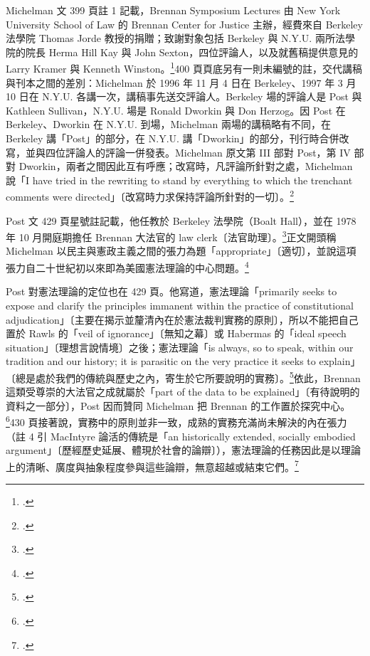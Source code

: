 Michelman 文 399 頁註 1 記載，Brennan Symposium Lectures 由 New York University School of Law 的 Brennan Center for Justice 主辦，經費來自 Berkeley 法學院 Thomas Jorde 教授的捐贈；致謝對象包括 Berkeley 與 N.Y.U. 兩所法學院的院長 Herma Hill Kay 與 John Sexton，四位評論人，以及就舊稿提供意見的 Larry Kramer 與 Kenneth Winston。\footcite[399 n.1]{michelman1998}400 頁頁底另有一則未編號的註，交代講稿與刊本之間的差別：Michelman 於 1996 年 11 月 4 日在 Berkeley、1997 年 3 月 10 日在 N.Y.U. 各講一次，講稿事先送交評論人。Berkeley 場的評論人是 Post 與 Kathleen Sullivan，N.Y.U. 場是 Ronald Dworkin 與 Don Herzog。因 Post 在 Berkeley、Dworkin 在 N.Y.U. 到場，Michelman 兩場的講稿略有不同，在 Berkeley 講「Post」的部分，在 N.Y.U. 講「Dworkin」的部分，刊行時合併改寫，並與四位評論人的評論一併發表。Michelman 原文第 III 部對 Post，第 IV 部對 Dworkin，兩者之間因此互有呼應；改寫時，凡評論所針對之處，Michelman 說「I have tried in the rewriting to stand by everything to which the trenchant comments were directed」〔改寫時力求保持評論所針對的一切〕。\footcite[400（頁底未編號之註）]{michelman1998}

Post 文 429 頁星號註記載，他任教於 Berkeley 法學院（Boalt Hall），並在 1978 年 10 月開庭期擔任 Brennan 大法官的 law clerk〔法官助理〕。\footcite[429 n.\textdagger]{post1998}正文開頭稱 Michelman 以民主與憲政主義之間的張力為題「appropriate」〔適切〕，並說這項張力自二十世紀初以來即為美國憲法理論的中心問題。\footcite[429]{post1998}

Post 對憲法理論的定位也在 429 頁。他寫道，憲法理論「primarily seeks to expose and clarify the principles immanent within the practice of constitutional adjudication」〔主要在揭示並釐清內在於憲法裁判實務的原則〕，所以不能把自己置於 Rawls 的「veil of ignorance」〔無知之幕〕或 Habermas 的「ideal speech situation」〔理想言說情境〕之後；憲法理論「is always, so to speak, within our tradition and our history; it is parasitic on the very practice it seeks to explain」〔總是處於我們的傳統與歷史之內，寄生於它所要說明的實務〕。\footcite[429 \& nn.1--2]{post1998}依此，Brennan 這類受尊崇的大法官之成就屬於「part of the data to be explained」〔有待說明的資料之一部分〕，Post 因而贊同 Michelman 把 Brennan 的工作置於探究中心。\footcite[429]{post1998}430 頁接著說，實務中的原則並非一致，成熟的實務充滿尚未解決的內在張力（註 4 引 MacIntyre 論活的傳統是「an historically extended, socially embodied argument」〔歷經歷史延展、體現於社會的論辯〕），憲法理論的任務因此是以理論上的清晰、廣度與抽象程度參與這些論辯，無意超越或結束它們。\footcite[429--430 \& n.4]{post1998}

